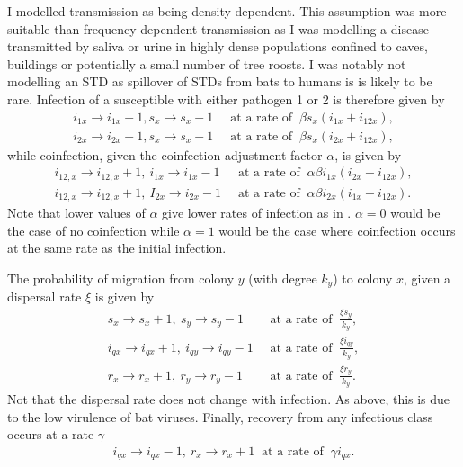 I modelled transmission as being density-dependent.
This assumption was more suitable than frequency-dependent transmission as I was modelling a disease transmitted by saliva or urine in highly dense populations confined to caves, buildings or potentially a small number of tree roosts.
I was notably not modelling an STD as spillover of STDs from bats to humans is is likely to be rare.
Infection of a susceptible with either pathogen 1 or 2 is therefore given by
\begin{align}
  i_{1x} \rightarrow i_{1x}+1, s_x \rightarrow s_x-1 &\;\;\text{at a rate of}\;\; \beta s_x\left(i_{1x} + i_{12x}\right),\\
  i_{2x} \rightarrow i_{2x}+1, s_x \rightarrow s_x-1  &\;\;\text{at a rate of}\;\; \beta s_x\left(i_{2x} + i_{12x}\right),
\end{align}
while coinfection, given the coinfection adjustment factor $\alpha$, is given by
\begin{align}
  i_{12,x} \rightarrow i_{12,x}+1,\: i_{1x} \rightarrow i_{1x}-1 &\;\;\text{at a rate of}\;\; \alpha\beta i_{1x}\left(i_{2x} + i_{12x}\right),\\
  i_{12,x} \rightarrow i_{12,x}+1,\: I_{2x} \rightarrow i_{2x}-1 &\;\;\text{at a rate of}\;\; \alpha\beta i_{2x}\left(i_{1x} + i_{12x}\right).
\end{align}
Note that lower values of $\alpha$ give lower rates of infection as in \textcite{castillo1989epidemiological}.
$\alpha = 0$ would be the case of no coinfection while $\alpha = 1$ would be the case where coinfection occurs at the same rate as the initial infection.

The probability of migration from colony $y$ (with degree $k_y$) to colony $x$, given a dispersal rate $\xi$ is given by
\begin{align}
  s_x \rightarrow s_x+1,\: s_y \rightarrow s_y-1 &\;\;\text{at a rate of}\;\; \frac{\xi s_y}{k_y},\\
  i_{qx} \rightarrow i_{qx}+1,\: i_{qy} \rightarrow i_{qy}-1 &\;\;\text{at a rate of}\;\; \frac{\xi i_{qy}}{k_y},\\
  r_x \rightarrow r_x+1,\: r_y \rightarrow r_y-1 &\;\;\text{at a rate of}\;\; \frac{\xi r_y}{k_y}.
\end{align}
Not that the dispersal rate does not change with infection.
As above, this is due to the low virulence of bat viruses.
Finally, recovery from any infectious class occurs at a rate $\gamma$
\begin{align}
  i_{qx} \rightarrow i_{qx}-1,\: r_x \rightarrow r_x+1  \;\;\text{at a rate of}\;\; \gamma i_{qx}.
\end{align}



